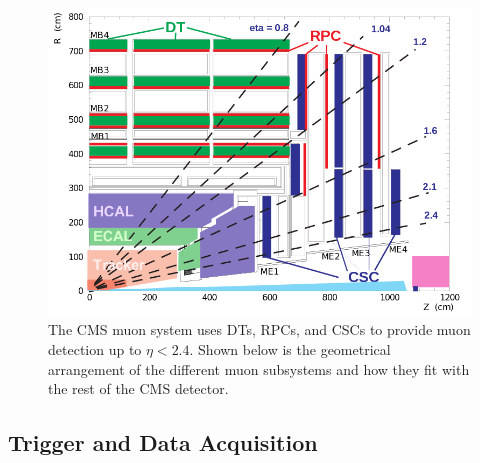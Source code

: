 \begin{figure}[tb]
\caption[The CMS Muon System]{
 The CMS muon system uses DTs, RPCs,
  and CSCs to provide muon detection
  up to $\eta < 2.4$.
 Shown below is the geometrical arrangement
  of the different muon
  subsystems and how they fit with
  the rest of the CMS detector.
 }
\label{fig:muon}
\includegraphics[width=\textwidth]{pdfs/experiment/cms_muon.png}
\end{figure}
 
\subsection{Trigger and Data Acquisition}



